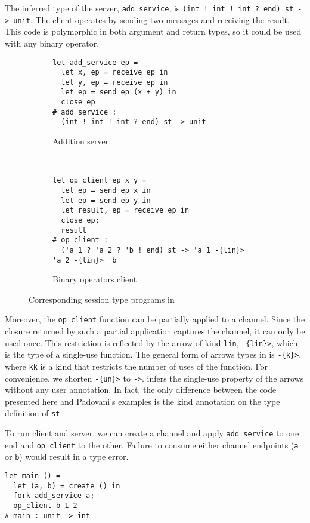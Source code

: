 The inferred type of the server, \lstinline{add_service}, is
\lstinline{(int ! int ! int ? end) st -> unit}.
The client operates by sending two messages
and receiving the result.
This code is polymorphic in both argument and return types, so it could
be used with any binary operator.
%
\begin{figure}[!h]
  \begin{subfigure}[t]{.5\linewidth}
\begin{lstlisting}
let add_service ep =
  let x, ep = receive ep in
  let y, ep = receive ep in
  let ep = send ep (x + y) in
  close ep
# add_service :
  (int ! int ! int ? end) st -> unit
\end{lstlisting}
    \caption{Addition server}
  \end{subfigure}~
  \begin{subfigure}[t]{.5\linewidth}
\begin{lstlisting}
let op_client ep x y =
  let ep = send ep x in
  let ep = send ep y in
  let result, ep = receive ep in
  close ep;
  result
# op_client :
  ('a_1 ? 'a_2 ? 'b ! end) st -> 'a_1 -{lin}> 'a_2 -{lin}> 'b
\end{lstlisting}
    \caption{Binary operators client}
  \end{subfigure}
  \caption{Corresponding session type programs in \lang}
  \label{fig:sessiontype}
\end{figure}
%
Moreover, the \lstinline/op_client/ function can be partially applied
to a channel. Since the closure returned by such a partial application
captures the channel, it can only be used once.  This restriction is
reflected by the arrow of kind \lstinline{lin}, \lstinline/-{lin}>/,
which is the type of a single-use function. 
The general form of
arrows types in \lang is \lstinline/-{k}>/, where \lstinline/kk/ is a
kind that restricts the number of uses of the function.  For
convenience, we shorten \lstinline/-{un}>/ to \lstinline/->/.  \lang
infers the
single-use property of the arrows without any user
annotation. In fact, the only difference between the
code presented here and Padovani's examples
\cite{DBLP:journals/jfp/Padovani17} is the kind annotation on the
type definition of \lstinline/st/.

To run client and server, we can create a channel and apply
\lstinline{add_service} to one end and \lstinline{op_client} to the other.
Failure to consume either channel endpoints (\lstinline/a/ or \lstinline/b/)
would result in a type error.
\begin{lstlisting}
let main () =
  let (a, b) = create () in
  fork add_service a;
  op_client b 1 2
# main : unit -> int
\end{lstlisting}


